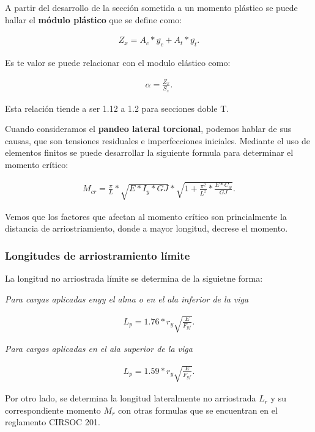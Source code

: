 \documentclass[../main.tex]{subfiles}
\begin{document}
A partir del desarrollo de la sección sometida a un momento plástico se puede 
hallar el \textbf{módulo plástico} que se define como:

\begin{align*}
  Z_x = A_c * \overline{y_c} + A_t * \overline{y_t}
.\end{align*}

Es te valor se puede relacionar con el modulo elástico como:

\begin{align*}
  \alpha = \frac{Z_x}{S_x}
.\end{align*}

Esta relación tiende a ser 1.12 a 1.2 para secciones doble T.

Cuando consideramos el \textbf{pandeo lateral torcional}, podemos hablar de sus
causas, que son tensiones residuales e imperfecciones iniciales.
Mediante el uso de elementos finitos se puede desarrollar la siguiente formula
para determinar el momento crítico:

\begin{align*}
  M_{cr} = \frac{\pi}{L} * \sqrt{E*I_y *GJ} *\sqrt{1+\frac{\pi^2}{L^2}*\frac{E*C_w}{GJ} }  
.\end{align*}

Vemos que los factores que afectan al momento crítico son princialmente la
distancia de arriostriamiento, donde a mayor longitud, decrese el momento.

\subsubsection{Longitudes de arriostramiento límite}

La longitud no arriostrada límite se determina de la siguietne forma:

\textit{Para cargas aplicadas enyy el alma o en el ala inferior de la viga}

\begin{align*}
  L_p = 1.76 * r_y \sqrt{\frac{E}{F_{yf}}} 
.\end{align*}

\textit{Para cargas aplicadas en el ala superior de la viga}

\begin{align*}
  L_p = 1.59 * r_y \sqrt{\frac{E}{F_{yf}}} 
.\end{align*}

Por otro lado, se determina la longitud lateralmente no arriostrada $L_r$ y
su correspondiente momento $M_r$ con otras formulas que se encuentran en el 
reglamento CIRSOC 201.
\end{document}
